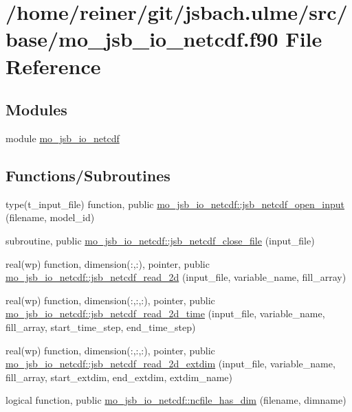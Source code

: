 \hypertarget{mo__jsb__io__netcdf_8f90}{}\section{/home/reiner/git/jsbach.ulme/src/base/mo\+\_\+jsb\+\_\+io\+\_\+netcdf.f90 File Reference}
\label{mo__jsb__io__netcdf_8f90}
\subsection*{Modules}
\begin{DoxyCompactItemize}
\item 
module \hyperlink{namespacemo__jsb__io__netcdf}{mo\+\_\+jsb\+\_\+io\+\_\+netcdf}
\end{DoxyCompactItemize}
\subsection*{Functions/\+Subroutines}
\begin{DoxyCompactItemize}
\item 
type(t\+\_\+input\+\_\+file) function, public \hyperlink{namespacemo__jsb__io__netcdf_a65a68943467734db9da1c09c39e50b4d}{mo\+\_\+jsb\+\_\+io\+\_\+netcdf\+::jsb\+\_\+netcdf\+\_\+open\+\_\+input} (filename, model\+\_\+id)
\item 
subroutine, public \hyperlink{namespacemo__jsb__io__netcdf_a930c28c3c36a4cad53a44d7fd0849fd2}{mo\+\_\+jsb\+\_\+io\+\_\+netcdf\+::jsb\+\_\+netcdf\+\_\+close\+\_\+file} (input\+\_\+file)
\item 
real(wp) function, dimension(\+:,\+:), pointer, public \hyperlink{namespacemo__jsb__io__netcdf_a6779dd8b9cd04d70eb5aba842875f0da}{mo\+\_\+jsb\+\_\+io\+\_\+netcdf\+::jsb\+\_\+netcdf\+\_\+read\+\_\+2d} (input\+\_\+file, variable\+\_\+name, fill\+\_\+array)
\item 
real(wp) function, dimension(\+:,\+:,\+:), pointer, public \hyperlink{namespacemo__jsb__io__netcdf_a5cdd38386756d348b9d7efeaccc170bb}{mo\+\_\+jsb\+\_\+io\+\_\+netcdf\+::jsb\+\_\+netcdf\+\_\+read\+\_\+2d\+\_\+time} (input\+\_\+file, variable\+\_\+name, fill\+\_\+array, start\+\_\+time\+\_\+step, end\+\_\+time\+\_\+step)
\item 
real(wp) function, dimension(\+:,\+:,\+:), pointer, public \hyperlink{namespacemo__jsb__io__netcdf_a91c6a275275258e361e32ffed8362b08}{mo\+\_\+jsb\+\_\+io\+\_\+netcdf\+::jsb\+\_\+netcdf\+\_\+read\+\_\+2d\+\_\+extdim} (input\+\_\+file, variable\+\_\+name, fill\+\_\+array, start\+\_\+extdim, end\+\_\+extdim, extdim\+\_\+name)
\item 
logical function, public \hyperlink{namespacemo__jsb__io__netcdf_a00a86f02344a16ec5309e26c61c3c8f1}{mo\+\_\+jsb\+\_\+io\+\_\+netcdf\+::ncfile\+\_\+has\+\_\+dim} (filename, dimname)
\end{DoxyCompactItemize}

